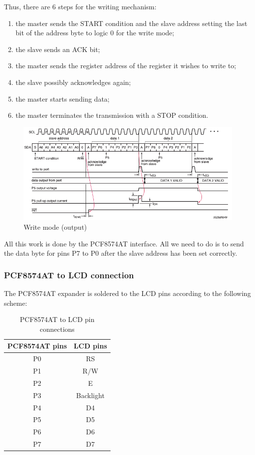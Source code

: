 \documentclass[a4paper, 12pt]{article}
\begin{document}
Thus, there are 6 steps for the writing mechanism:
\begin{enumerate}
    \item the master sends the START condition and the slave address setting the
    last bit of the address byte to logic 0 for the write mode;
    \item the slave sends an ACK bit;
    \item the master sends the register address of the register it wishes to write to;
    \item the slave possibly acknowledges again;
    \item the master starts sending data;
    \item the master terminates the transmission with a STOP condition.
\end{enumerate}

\begin{figure}[h]
    \includegraphics[width=14cm]{write_mode_expander}
    \centering
    \caption{Write mode (output)}
\end{figure}

All this work is done by the PCF8574AT interface.
All we need to do is to send the data byte for pins P7 to P0 after the slave address has been set correctly.

\subsubsection{PCF8574AT to LCD connection}
The PCF8574AT expander is soldered to the LCD pins according to the following scheme:

\begin{table}[h]
    \centering
    \begin{tabular}{c c} 
        \hline
        PCF8574AT pins & LCD pins \\ [0.5ex] 
        \hline\hline
        P0 & RS \\
        P1 & R/W \\
        P2 & E \\
        P3 & Backlight \\
        P4 & D4 \\
        P5 & D5 \\
        P6 & D6 \\
        P7 & D7 \\
        \hline
    \end{tabular}
    \caption{PCF8574AT to LCD pin connections}
\end{table}
\end{document}
